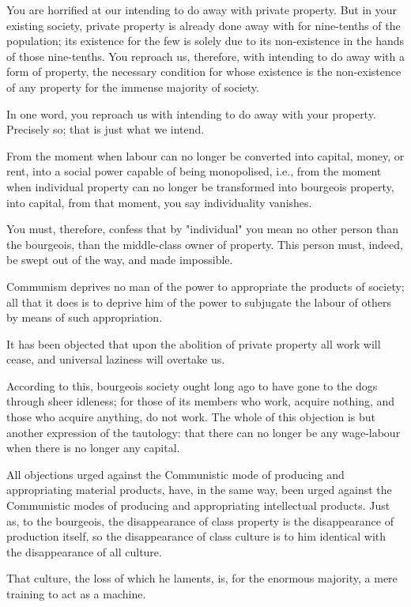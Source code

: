 \documentclass[11pt]{book}
\begin{document}
You are horrified at our intending to do away with private
property.  But in your existing society, private property is
already done away with for nine-tenths of the population; its
existence for the few is solely due to its non-existence in the
hands of those nine-tenths.  You reproach us, therefore, with
intending to do away with a form of property, the necessary
condition for whose existence is the non-existence of any
property for the immense majority of society.

In one word, you reproach us with intending to do away with your
property.  Precisely so; that is just what we intend.

From the moment when labour can no longer be converted into
capital, money, or rent, into a social power capable of being
monopolised, i.e., from the moment when individual property can
no longer be transformed into bourgeois property, into capital,
from that moment, you say individuality vanishes.

You must, therefore, confess that by "individual" you mean no
other person than the bourgeois, than the middle-class owner of
property.  This person must, indeed, be swept out of the way, and
made impossible.

Communism deprives no man of the power to appropriate the
products of society; all that it does is to deprive him of the
power to subjugate the labour of others by means of such
appropriation.

It has been objected that upon the abolition of private property
all work will cease, and universal laziness will overtake us.

According to this, bourgeois society ought long ago to have gone
to the dogs through sheer idleness; for those of its members who
work, acquire nothing, and those who acquire anything, do not
work. The whole of this objection is but another expression of
the tautology: that there can no longer be any wage-labour when
there is no longer any capital.

All objections urged against the Communistic mode of producing
and appropriating material products, have, in the same way,
been urged against the Communistic modes of producing and
appropriating intellectual products.  Just as, to the bourgeois,
the disappearance of class property is the disappearance of
production itself, so the disappearance of class culture is to
him identical with the disappearance of all culture.

That culture, the loss of which he laments, is, for the enormous
majority, a mere training to act as a machine.
\end{document}
